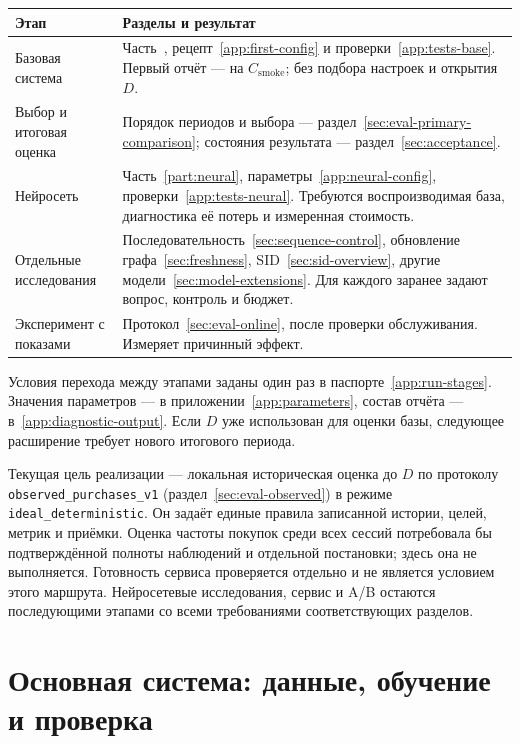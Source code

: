 \documentclass[12pt,a4paper]{article}
\newcommand{\code}[1]{{\ttfamily\small\nolinkurl{#1}}}
\theoremstyle{plainru}
\begin{document}
\begin{longtable}{L{0.22\textwidth}L{0.69\textwidth}}
\toprule Этап & Разделы и результат \\\midrule\endhead
Базовая система & Часть~\ref{part:core}, рецепт~\ref{app:first-config}
и проверки~\ref{app:tests-base}. Первый отчёт --- на
$C_{\mathrm{smoke}}$; без подбора настроек и открытия $D$. \\
Выбор и итоговая оценка & Порядок периодов и выбора ---
раздел~\ref{sec:eval-primary-comparison}; состояния результата ---
раздел~\ref{sec:acceptance}. \\
Нейросеть & Часть~\ref{part:neural}, параметры~\ref{app:neural-config},
проверки~\ref{app:tests-neural}. Требуются воспроизводимая база,
диагностика её потерь и измеренная стоимость. \\
Отдельные исследования & Последовательность~\ref{sec:sequence-control},
обновление графа~\ref{sec:freshness}, SID~\ref{sec:sid-overview},
другие модели~\ref{sec:model-extensions}. Для каждого заранее задают
вопрос, контроль и бюджет. \\
Эксперимент с показами & Протокол~\ref{sec:eval-online},
после проверки обслуживания. Измеряет причинный эффект. \\
\bottomrule
\end{longtable}

Условия перехода между этапами заданы один раз в
паспорте~\ref{app:run-stages}. Значения параметров ---
в приложении~\ref{app:parameters}, состав отчёта ---
в~\ref{app:diagnostic-output}. Если $D$ уже использован для оценки базы,
следующее расширение требует нового итогового периода.

Текущая цель реализации --- локальная историческая оценка до $D$
по протоколу \code{observed_purchases_v1}
(раздел~\ref{sec:eval-observed}) в режиме \code{ideal_deterministic}.
Он задаёт единые правила записанной истории, целей, метрик и приёмки.
Оценка частоты покупок среди всех сессий потребовала бы подтверждённой
полноты наблюдений и отдельной постановки; здесь она не выполняется.
Готовность сервиса проверяется
отдельно и не является условием этого маршрута. Нейросетевые исследования,
сервис и A/B остаются последующими этапами со всеми требованиями
соответствующих разделов.

\clearpage
\begingroup
\small
\setlength{\parskip}{0.1\baselineskip}
\tableofcontents
\endgroup
\clearpage

\part{Основная система: данные, обучение и проверка}\label{part:core}
\end{document}
